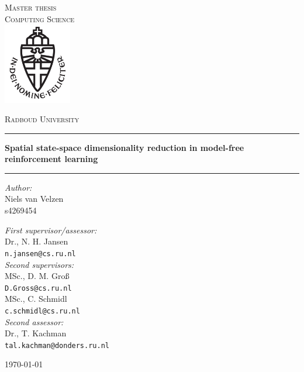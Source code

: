 \documentclass[11pt,a4paper]{report}
\begin{document}
\begin{titlepage}
\begin{center}
\textsc{\LARGE Master thesis\\Computing Science}\\[1.5cm]
\includegraphics[height=100pt]{logo}

\vspace{0.4cm}
\textsc{\Large Radboud University}\\[1cm]
\hrule
\vspace{0.4cm}
\textbf{\huge Spatial state-space dimensionality reduction in model-free reinforcement learning}\\[0.4cm]
\hrule
\vspace{2cm}
\begin{minipage}[t]{0.45\textwidth}
\begin{flushleft} \large
\textit{Author:}\\
Niels van Velzen\\
s4269454
\end{flushleft}
\end{minipage}
\begin{minipage}[t]{0.45\textwidth}
\begin{flushright} \large
\textit{First supervisor/assessor:}\\
Dr., N. H. Jansen\\
\texttt{n.jansen@cs.ru.nl}\\[0.8cm]
\textit{Second supervisors:}\\
MSc., D. M. Gro{\ss}\\
\texttt{D.Gross@cs.ru.nl}\\[0.4cm]
MSc., C. Schmidl\\
\texttt{c.schmidl@cs.ru.nl}\\[0.8cm]
\textit{Second assessor:}\\
Dr., T. Kachman\\
\texttt{tal.kachman@donders.ru.nl}\\[1.0cm]
\end{flushright}
\end{minipage}
\vfill
{\large \today}
\end{center}
\end{titlepage}



\tableofcontents










\appendix

\end{document}

